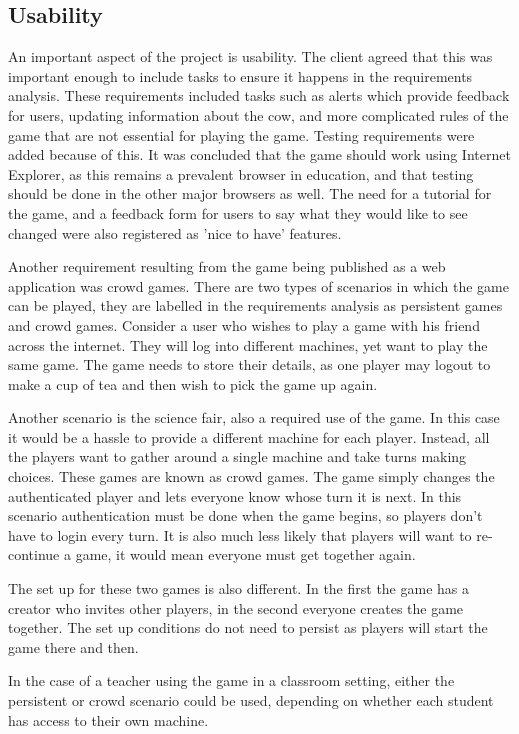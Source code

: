 \subsection{Usability}
An important aspect of the project is usability. The client agreed that this was important enough to include tasks to ensure it happens in the requirements analysis. These requirements included tasks such as alerts which provide feedback for users, updating information about the cow, and more complicated rules of the game that are not essential for playing the game. Testing requirements were added because of this. It was concluded that the game should work using Internet Explorer, as this remains a prevalent browser in education, and that testing should be done in the other major browsers as well. The need for a tutorial for the game, and a feedback form for users to say what they would like to see changed were also registered as 'nice to have' features.
	
Another requirement resulting from the game being published as a web application was crowd games. There are two types of scenarios in which the game can be played, they are labelled in the requirements analysis as persistent games and crowd games. Consider a user who wishes to play a game with his friend across the internet. They will log into different machines, yet want to play the same game. The game needs to store their details, as one player may logout to make a cup of tea and then wish to pick the game up again.
	
Another scenario is the science fair, also a required use of the game. In this case it would be a hassle to provide a different machine for each player. Instead, all the players want to gather around a single machine and take turns making choices. These games are known as crowd games. The game simply changes the authenticated player and lets everyone know whose turn it is next. In this scenario authentication must be done when the game begins, so players don't have to login every turn. It is also much less likely that players will want to re-continue a game, it would mean everyone must get together again.
	
The set up for these two games is also different. In the first the game has a creator who invites other players, in the second everyone creates the game together. The set up conditions do not need to persist as players will start the game there and then.
	 
In the case of a teacher using the game in a classroom setting, either the persistent or crowd scenario could be used, depending on whether each student has access to their own machine.
	
